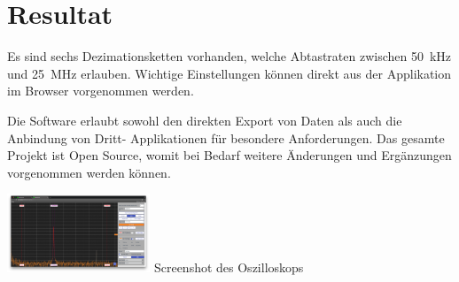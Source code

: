 {    %
    \section{Resultat}
    Es  sind sechs  Dezimationsketten vorhanden,  welche Abtastraten  zwischen
    \SI{50}{\kHz} und  \SI{25}{\MHz} erlauben. Wichtige  Einstellungen können
    direkt aus der Applikation im Browser vorgenommen werden.

    Die Software  erlaubt sowohl den  direkten Export  von Daten als  auch die
    Anbindung  von Dritt-  Applikationen f\"ur  besondere Anforderungen.   Das
    gesamte Projekt ist Open Source, womit bei Bedarf weitere \"Anderungen und
    Erg\"anzungen vorgenommen werden k\"onnen.

    \vspace{4ex}
    \begin{center}
        \includegraphics[width=0.32\textwidth]{images/scope.png}
        \footnotesize{Screenshot des Oszilloskops}
    \end{center}
}

